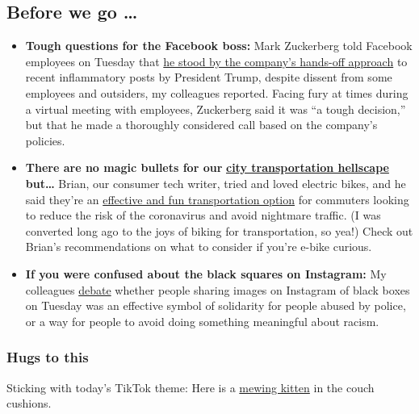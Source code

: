 \hypertarget{before-we-go-}{%
\subsection{Before we go \ldots{}}\label{before-we-go-}}

\begin{itemize}
\item
  \textbf{Tough questions for the Facebook boss:} Mark Zuckerberg told
  Facebook employees on Tuesday that
  \href{https://www.nytimes3xbfgragh.onion/2020/06/02/technology/zuckerberg-defends-facebook-trump-posts.html}{he
  stood by the company's hands-off approach} to recent inflammatory
  posts by President Trump, despite dissent from some employees and
  outsiders, my colleagues reported. Facing fury at times during a
  virtual meeting with employees, Zuckerberg said it was ``a tough
  decision,'' but that he made a thoroughly considered call based on the
  company's policies.
\item
  \textbf{There are no magic bullets for our}
  \textbf{\href{https://www.nytimes3xbfgragh.onion/2020/05/27/technology/public-transportation-cities-pandemic.html}{city
  transportation hellscape}} \textbf{but\ldots{}} Brian, our consumer
  tech writer, tried and loved electric bikes, and he said they're an
  \href{https://www.nytimes3xbfgragh.onion/2020/06/03/technology/personaltech/e-bikes-are-having-their-moment-they-deserve-it.html}{effective
  and fun transportation option} for commuters looking to reduce the
  risk of the coronavirus and avoid nightmare traffic. (I was converted
  long ago to the joys of biking for transportation, so yea!) Check out
  Brian's recommendations on what to consider if you're e-bike curious.
\item
  \textbf{If you were confused about the black squares on Instagram:} My
  colleagues
  \href{https://www.nytimes3xbfgragh.onion/2020/06/02/style/instagram-blackout.html}{debate}
  whether people sharing images on Instagram of black boxes on Tuesday
  was an effective symbol of solidarity for people abused by police, or
  a way for people to avoid doing something meaningful about racism.
\end{itemize}

\hypertarget{hugs-to-this}{%
\subsubsection{Hugs to this}\label{hugs-to-this}}

Sticking with today's TikTok theme: Here is a
\href{https://www.tiktok.com/@miaamabile/video/6807566845948873990}{mewing
kitten} in the couch cushions.

